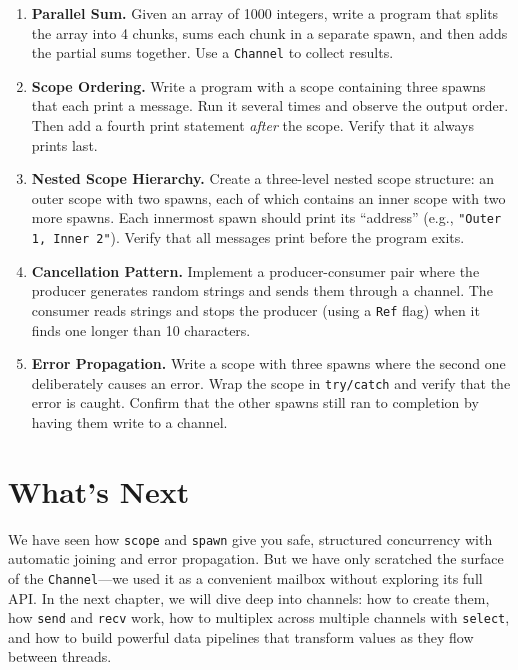 \begin{enumerate}[label=\textbf{\arabic*.}]

  \item \textbf{Parallel Sum.} Given an array of 1000 integers, write a program that splits the array into 4 chunks, sums each chunk in a separate spawn, and then adds the partial sums together. Use a \lstinline|Channel| to collect results.

  \item \textbf{Scope Ordering.} Write a program with a scope containing three spawns that each print a message. Run it several times and observe the output order. Then add a fourth print statement \emph{after} the scope. Verify that it always prints last.

  \item \textbf{Nested Scope Hierarchy.} Create a three-level nested scope structure: an outer scope with two spawns, each of which contains an inner scope with two more spawns. Each innermost spawn should print its ``address'' (e.g., \lstinline|"Outer 1, Inner 2"|). Verify that all messages print before the program exits.

  \item \textbf{Cancellation Pattern.} Implement a producer-consumer pair where the producer generates random strings and sends them through a channel. The consumer reads strings and stops the producer (using a \lstinline|Ref| flag) when it finds one longer than 10 characters.

  \item \textbf{Error Propagation.} Write a scope with three spawns where the second one deliberately causes an error. Wrap the scope in \lstinline|try/catch| and verify that the error is caught. Confirm that the other spawns still ran to completion by having them write to a channel.

\end{enumerate}

\section*{What's Next}

We have seen how \lstinline|scope| and \lstinline|spawn| give you safe, structured concurrency with automatic joining and error propagation.
But we have only scratched the surface of the \lstinline|Channel|---we used it as a convenient mailbox without exploring its full API.
In the next chapter, we will dive deep into channels: how to create them, how \lstinline|send| and \lstinline|recv| work, how to multiplex across multiple channels with \lstinline|select|, and how to build powerful data pipelines that transform values as they flow between threads.
